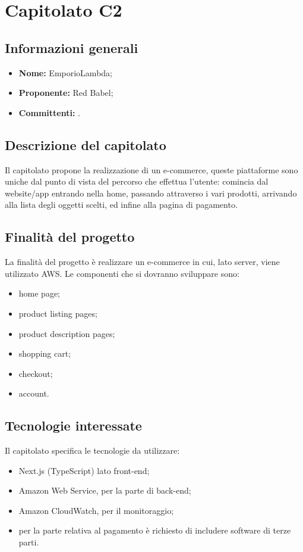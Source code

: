 \section{Capitolato C2}

\subsection{Informazioni generali}
\begin{itemize}
\item \textbf{Nome:} EmporioLambda;
\item \textbf{Proponente:} Red Babel;
\item \textbf{Committenti:} \committenti{}.
\end{itemize}

\subsection{Descrizione del capitolato}
Il capitolato propone la realizzazione di un e-commerce, queste piattaforme sono uniche dal punto di vista del percorso che effettua l'utente: comincia dal website/app entrando nella home, passando attraverso i vari prodotti, arrivando alla lista degli oggetti scelti, ed infine alla pagina di pagamento. 

\subsection{Finalità del progetto}
La finalità del progetto è realizzare un e-commerce in cui, lato server, viene utilizzato AWS. Le componenti che si dovranno sviluppare sono:
\begin{itemize}
\item home page;
\item product listing pages;
\item product description pages;
\item shopping cart;
\item checkout;
\item account.
\end{itemize}

\subsection{Tecnologie interessate}
Il capitolato specifica le tecnologie da utilizzare:
\begin{itemize}
\item Next.js (TypeScript) lato front-end;
\item Amazon Web Service, per la parte di back-end;
\item Amazon CloudWatch, per il monitoraggio;
\item per la parte relativa al pagamento è richiesto di includere software di terze parti.
\end{itemize}

